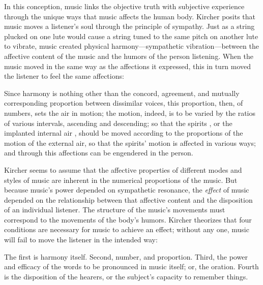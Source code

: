 In this conception, music links the objective truth with subjective experience
through the unique ways that music affects the human body.  
Kircher posits that music moves a listener's soul through the principle of
sympathy.%
    \Autocites
    {Gouk:Sciences}
    {Gouk:Harmonics}
Just as a string plucked on one lute would cause a string tuned to the same
pitch on another lute to vibrate, music created physical harmony---sympathetic
vibration---between the affective content of the music and the humors of the
person listening.
When the music moved in the same way as the affections it expressed, this in
turn moved the listener to feel the same affections:
\begin{quoting}
    Since harmony is nothing other than the concord, agreement, and mutually
    corresponding proportion between dissimilar voices, this proportion, then,
    of numbers, sets the air in motion; the motion, indeed, is to be varied by
    the ratios of various intervals, ascending and descending; so that the
    spirits , or the implanted internal air
     \Dots{}, should be moved according to the proportions
    of the motion of the external air, so that the spirits' motion is affected
    in various ways; and through this affections can be engendered in the
    person.%
        \Autocite[552]{Kircher:Musurgia}
\end{quoting}
Kircher seems to assume that the affective properties of different modes and
styles of music are inherent in the numerical proportions of the music. 
But because music's power depended on sympathetic resonance, the \emph{effect}
of music depended on the relationship between that affective content and the
disposition of an individual listener.
The structure of the music's movements must correspond to the movements of the
body's humors.
Kircher theorizes that four conditions are necessary for music to achieve an
effect; without any one, music will fail to move the listener in the intended
way:
\begin{quoting}
    The first is harmony itself. Second, number, and proportion. Third, the
    power and efficacy of the words to be pronounced in music itself; or, the
    oration.
    Fourth is the disposition of the hearers, or the subject's capacity to
    remember things.%
        \Autocite[550]{Kircher:Musurgia}
\end{quoting}


